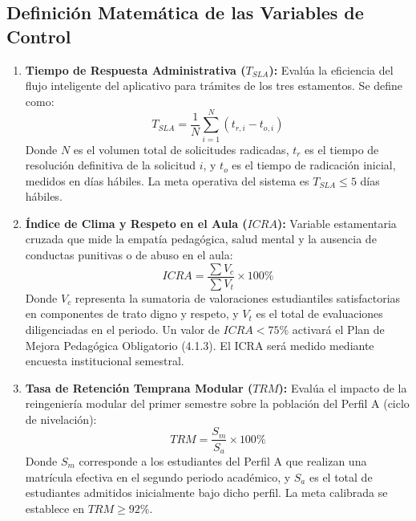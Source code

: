\documentclass[journal,10pt,twocolumn,letterpaper]{IEEEtran}
\begin{document}
\subsection{Definición Matemática de las Variables de Control}
\begin{enumerate}
    \item \textbf{Tiempo de Respuesta Administrativa ($T_{SLA}$):} Evalúa la eficiencia del flujo inteligente del aplicativo para trámites de los tres estamentos. Se define como:
    \begin{equation}
    T_{SLA} = \frac{1}{N} \sum_{i=1}^{N} (t_{r, i} - t_{o, i})
    \end{equation}
    Donde $N$ es el volumen total de solicitudes radicadas, $t_{r}$ es el tiempo de resolución definitiva de la solicitud $i$, y $t_{o}$ es el tiempo de radicación inicial, medidos en días hábiles. La meta operativa del sistema es $T_{SLA} \le 5$ días hábiles.
    
    \item \textbf{Índice de Clima y Respeto en el Aula ($ICRA$):} Variable estamentaria cruzada que mide la empatía pedagógica, salud mental y la ausencia de conductas punitivas o de abuso en el aula:
    \begin{equation}
    ICRA = \frac{\sum V_{c}}{\sum V_{t}} \times 100\%
    \end{equation}
    Donde $V_{c}$ representa la sumatoria de valoraciones estudiantiles satisfactorias en componentes de trato digno y respeto, y $V_{t}$ es el total de evaluaciones diligenciadas en el periodo. Un valor de $ICRA < 75\%$ activará el Plan de Mejora Pedagógica Obligatorio (4.1.3). El ICRA será medido mediante encuesta institucional semestral.
    
    \item \textbf{Tasa de Retención Temprana Modular ($TRM$):} Evalúa el impacto de la reingeniería modular del primer semestre sobre la población del Perfil A (ciclo de nivelación):
    \begin{equation}
    TRM = \frac{S_{m}}{S_{a}} \times 100\%
    \end{equation}
    Donde $S_{m}$ corresponde a los estudiantes del Perfil A que realizan una matrícula efectiva en el segundo periodo académico, y $S_{a}$ es el total de estudiantes admitidos inicialmente bajo dicho perfil. La meta calibrada se establece en $TRM \ge 92\%$.
\end{enumerate}
\end{document}
